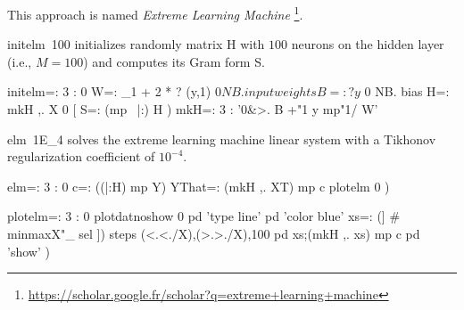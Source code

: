\documentclass[10pt]{article}%
\begin{document}
This approach is named \emph{Extreme Learning Machine}
\footnote{\url{https://scholar.google.fr/scholar?q=extreme+learning+machine}}.

{\Tt{}initelm\ 100\nwendquote} initializes randomly matrix H with $100$ neurons on the hidden
layer (i.e., $M=100$) and computes its Gram form {\Tt{}S\nwendquote}.

\nwenddocs{}\endmoddef\nwstartdeflinemarkup{}\nwenddeflinemarkup
initelm=: 3 : 0
  W=: _1 + 2 * ? (y,1) $ 0 NB. input weights
  B=: ? y $ 0 NB. bias
  H=: mkH ,. X
  0 [ S=: (mp~ |:) H
)
mkH=: 3 : '0&>. B +"1 y mp"1/ W'

\nwendcode{}\nwdocspar
{\Tt{}elm\ 1E{\_}4\nwendquote} solves the extreme learning machine linear system with a Tikhonov
regularization coefficient of $10^{-4}$.

\nwenddocs{}\plusendmoddef\nwstartdeflinemarkup{}\nwenddeflinemarkup
elm=: 3 : 0
  c=: ((|:H) mp Y) %
  YThat=: (mkH ,. XT) mp c
  plotelm 0
)

\nwendcode{}\endmoddef\nwstartdeflinemarkup{}\nwenddeflinemarkup
plotelm=: 3 : 0
  plotdatnoshow 0
  pd 'type line'
  pd 'color blue'
  xs=: (] #~ minmaxX"_ sel ]) steps (<.<./X),(>.>./X),100
  pd xs;(mkH ,. xs) mp c
  pd 'show'
)
\end{document}
